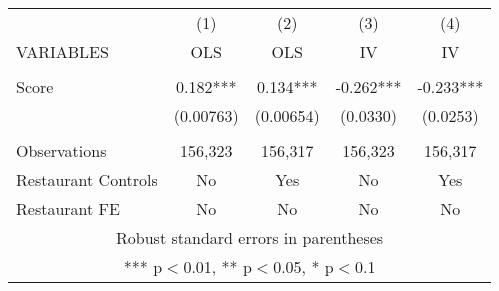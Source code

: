\begin{tabular}{lcccc} \hline
 & (1) & (2) & (3) & (4) \\
VARIABLES & OLS & OLS & IV & IV \\ \hline
 &  &  &  &  \\
Score & 0.182*** & 0.134*** & -0.262*** & -0.233*** \\
 & (0.00763) & (0.00654) & (0.0330) & (0.0253) \\
 &  &  &  &  \\
Observations & 156,323 & 156,317 & 156,323 & 156,317 \\
Restaurant Controls & No & Yes & No & Yes \\
 Restaurant FE & No & No & No & No \\ \hline
\multicolumn{5}{c}{ Robust standard errors in parentheses} \\
\multicolumn{5}{c}{ *** p$<$0.01, ** p$<$0.05, * p$<$0.1} \\
\end{tabular}
